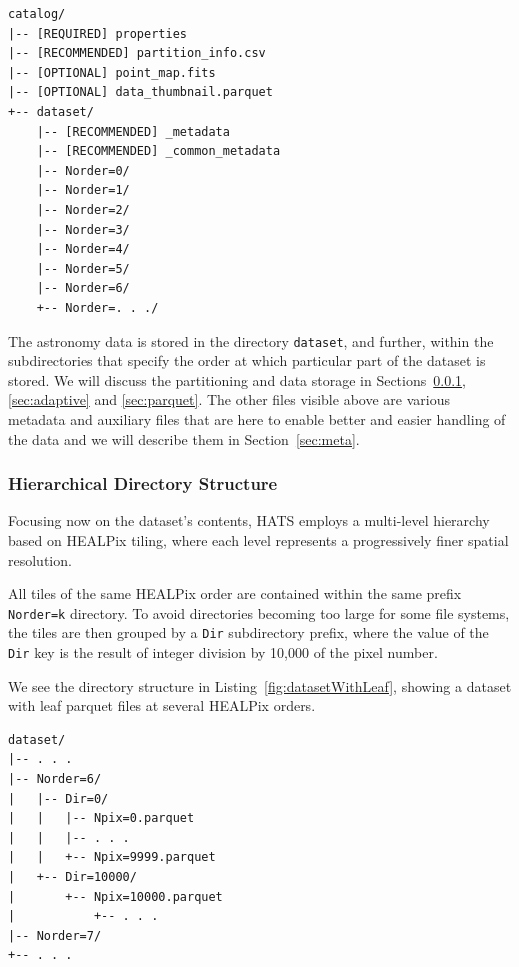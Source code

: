 \documentclass[11pt,a4paper]{ivoa}
\begin{document}
\begin{minipage}{\linewidth}
\begin{lstlisting}[caption=Example catalog directory contents, label=fig:exampleCatalogStructure]
catalog/
|-- [REQUIRED] properties
|-- [RECOMMENDED] partition_info.csv
|-- [OPTIONAL] point_map.fits
|-- [OPTIONAL] data_thumbnail.parquet
+-- dataset/
    |-- [RECOMMENDED] _metadata
    |-- [RECOMMENDED] _common_metadata
    |-- Norder=0/
    |-- Norder=1/
    |-- Norder=2/
    |-- Norder=3/
    |-- Norder=4/
    |-- Norder=5/
    |-- Norder=6/
    +-- Norder=. . ./
\end{lstlisting}
\end{minipage}

The astronomy data is stored in the directory \texttt{dataset}, and further, within the subdirectories that specify the order at which particular part of the dataset is stored. 
We will discuss the partitioning and data storage in Sections~\ref{sec:hierarchical}, \ref{sec:adaptive} and \ref{sec:parquet}. 
The other files visible above are various metadata and auxiliary files that are here to enable better and easier handling of the data and we will describe them in Section~\ref{sec:meta}. 
    
\subsubsection{Hierarchical Directory Structure} \label{sec:hierarchical}
Focusing now on the dataset's contents, HATS employs a multi-level hierarchy based on HEALPix tiling, where each level represents a progressively finer spatial resolution.

All tiles of the same HEALPix order are contained within the same prefix \texttt{Norder=k} directory. 
To avoid directories becoming too large for some file systems, the tiles are then grouped by a \texttt{Dir} subdirectory prefix,
where the value of the \texttt{Dir} key is the result of integer division by 10,000 of the pixel number.

We see the directory structure in Listing~\ref{fig:datasetWithLeaf}, showing a dataset with leaf parquet files at several HEALPix orders.

\begin{minipage}{\linewidth}
\begin{lstlisting}[caption=Example catalog dataset directory contents, label=fig:datasetWithLeaf]
dataset/
|-- . . .
|-- Norder=6/
|   |-- Dir=0/
|   |   |-- Npix=0.parquet
|   |   |-- . . .
|   |   +-- Npix=9999.parquet
|   +-- Dir=10000/
|       +-- Npix=10000.parquet
|           +-- . . .
|-- Norder=7/
+-- . . .
\end{lstlisting} 
\end{minipage}
\end{document}
